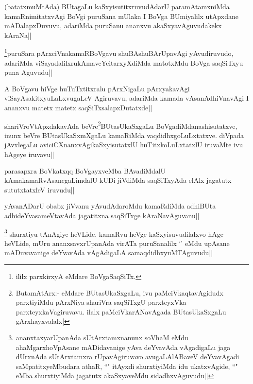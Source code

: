 \begin{artha}
(batatxmuMtAda) BUtagaLu kaSxyisutitxruvudAdarU paramAtamxniMda kamaRnimitatxvAgi BoVgi puruSana mUlaka I BoVga BUmiyalilx utApxdane mADalapxDuvuvu, adariMda puruSanu ananxvu akaSxyavAguvudakekx kAraNa||
\end{artha}

\begin{artha}
\footnote[1]{ililx parxkirxyA eMdare BoVgaSaqSiTx.}puruSara pArxciVnakamaRBoVgavu shuBAshuBArUpavAgi yAvudiruvudo, adariMda viSayadalilxrukAmaveYcitarxyXdiMda matotxMdu BoVga saqSiTxyu puna Aguvudu||
\end{artha}

\begin{artha}
A BoVgavu hiVge huTuTxtitxralu pArxNigaLu pArxyakavAgi viSayAsakitxyuLaLxvugaLeV Agiruvavu, adariMda kamada vAsanAdhiVnavAgi I ananxvu matetx matetx saqSiTxsalapxDutatxde||
\end{artha}

\begin{artha}
shariVroVtApxdakavAda beVre\footnote[2]{ButamAtArx:- eMdare BUtasUkaSxgaLu, ivu paMciVkaqtavAgidudx parxtiyiMdu pArxNiya shariVra saqSiTxgU parxteyxVka parxteyxkaVagiruvavu. ilalx  paMciVkarANavAgada BUtasUkaSxgaLu gArxhayxvalalx|}BUtasUkaSxgaLu BoVgadiMdanashisutatxve, inunx beVre BUtasUkaSxmXgaLu kamaRiMda vaqdidhxgoLuLxtatxve. diVpada jAvxlegaLu aviciCXnanxvAgikaSxyisutatxlU huTitxkoLuLxtatxlU iruvaMte ivu hAgeye iruvavu||
\end{artha}

\begin{artha}
parasapxra BoVkatxqq BoVgayxveMba BAvadiMdalU kAmakamaRvAsanegaLimdalU kUDi jiVdiMda saqSiTxyAda elAlx jagatutx sututxtatxleV iruvudu||
\end{artha}

\begin{artha}
yAvanADarU obabx jiVvanu yAvudAdaroMdu kamaRdiMda adhiBUta adhideYvasameVtavAda jagatitxna saqSiTxge kAraNavAguvanu||
\end{artha}

\begin{artha}
\footnote[1]{ananxtaxyarUpanAda sUtArxtamxnanunx soV\s haM eMdu ahaMgarxhoVpAsane mADidavanige yAva deYvavAda vAgadigaLu jaga dUrxnAda sUtArxtamxra rUpavAgiruvavo avugaLAlABaveV deYvavAgadi saMpatitxyeMbudara athaR, ``\stext" itAyxdi shurxtiyiMda idu ukatxvAgide, ``\stext" eMba shurxtiyiMda jagatutx akaSxyaveMdu sidadhxvAguvudu||} shurxtiyu tAnAgiye heVLide. kamaRvu heVge kaSxyisuvudilalxvo hAge heVLide, mUru ananxsavxrUpanAda virATa puruSanalilx `\stext' eMdu upAsane mADuvavanige deYvavAda vAgAdigaLA samaqdidhxyuMTAguvudu||
\end{artha}

